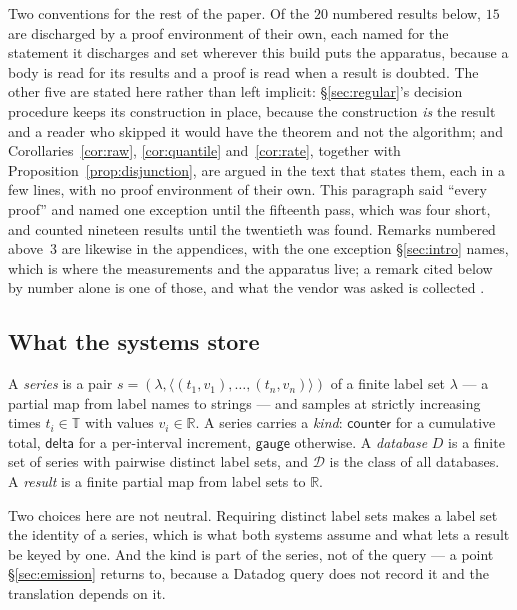 Two conventions for the rest of the paper. Of the $20$ numbered results below, $15$ are
discharged by a proof environment of their own, each named for the statement it
discharges and set wherever this build puts the apparatus, because a body is read for
its results and a proof is read when a result is doubted. The other
five are stated here rather than left implicit: \S\ref{sec:regular}'s decision procedure
keeps its construction in place, because the construction \emph{is} the result and a
reader who skipped it would have the theorem and not the algorithm; and
Corollaries~\ref{cor:raw}, \ref{cor:quantile} and~\ref{cor:rate}, together with
Proposition~\ref{prop:disjunction}, are
argued in the text that states them, each in a few lines, with no proof environment of
their own. This paragraph said ``every proof'' and named one exception until the
fifteenth pass, which was four short, and counted nineteen results until the twentieth
was found. Remarks numbered above~3 are likewise in the appendices, with the one
exception \S\ref{sec:intro} names, which is
where the measurements and the apparatus live; a remark cited below by number alone is
one of those, and what the vendor was asked is collected .

\subsection{What the systems store}

\begin{definition}\label{def:model}
A \emph{series} is a pair $s=(\lambda,\langle (t_1,v_1),\dots,(t_n,v_n)\rangle)$ of a
finite label set $\lambda$ --- a partial map from label names to strings --- and samples
at strictly increasing times $t_i\in\mathbb{T}$ with values $v_i\in\mathbb{R}$. A series
carries a \emph{kind}: $\mathsf{counter}$ for a cumulative total, $\mathsf{delta}$ for a
per-interval increment, $\mathsf{gauge}$ otherwise. A \emph{database} $D$ is a finite set
of series with pairwise distinct label sets, and $\mathcal{D}$ is the class of all
databases. A \emph{result} is a finite partial map from label sets to $\mathbb{R}$.
\end{definition}

\noindent
Two choices here are not neutral. Requiring distinct label sets makes a label set the
identity of a series, which is what both systems assume and what lets a result be keyed
by one. And the kind is part of the series, not of the query --- a point
\S\ref{sec:emission} returns to, because a Datadog query does not record it and the
translation depends on it.

